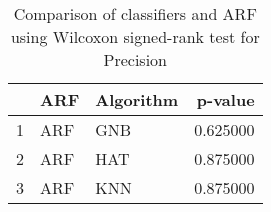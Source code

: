 \begin{table}
\footnotesize
\caption{Comparison of classifiers and ARF using Wilcoxon signed-rank test for Precision}
\label{tab:ARF wilcoxon Precision comparison}
\begin{tabular}{lllr}
\hline
 & ARF & Algorithm & p-value \\
\hline
1 & ARF & GNB & 0.625000 \\
2 & ARF & HAT & 0.875000 \\
3 & ARF & KNN & 0.875000 \\
\hline
\end{tabular}
\end{table}

